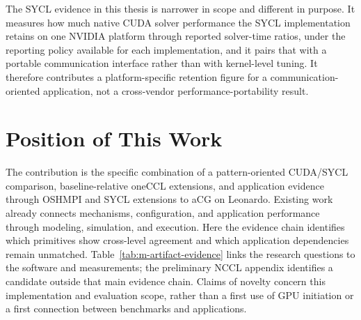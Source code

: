 The SYCL evidence in this thesis is narrower in scope and different in purpose. It measures how much native CUDA solver performance the SYCL implementation retains on one NVIDIA platform through reported solver-time ratios, under the reporting policy available for each implementation, and it pairs that with a portable communication interface rather than with kernel-level tuning. It therefore contributes a platform-specific retention figure for a communication-oriented application, not a cross-vendor performance-portability result.

\section{Position of This Work}

The contribution is the specific combination of a pattern-oriented CUDA/SYCL comparison, baseline-relative oneCCL extensions, and application evidence through OSHMPI and SYCL extensions to aCG on Leonardo. Existing work already connects mechanisms, configuration, and application performance through modeling, simulation, and execution. Here the evidence chain identifies which primitives show cross-level agreement and which application dependencies remain unmatched. Table~\ref{tab:m-artifact-evidence} links the research questions to the software and measurements; the preliminary NCCL appendix identifies a candidate outside that main evidence chain. Claims of novelty concern this implementation and evaluation scope, rather than a first use of GPU initiation or a first connection between benchmarks and applications.
